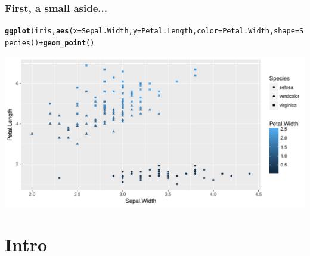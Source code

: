 \documentclass{beamer}\usepackage[]{graphicx}\usepackage[]{color}
\makeatletter
\def\maxwidth{ %
  \ifdim\Gin@nat@width>\linewidth
    \linewidth
  \else
    \Gin@nat@width
  \fi
}
\newcommand{\hlopt}[1]{\textcolor[rgb]{0,0,0}{#1}}%
\newcommand{\hlstd}[1]{\textcolor[rgb]{0.345,0.345,0.345}{#1}}%
\newcommand{\hlkwc}[1]{\textcolor[rgb]{0.333,0.667,0.333}{#1}}%
\newcommand{\hlkwd}[1]{\textcolor[rgb]{0.737,0.353,0.396}{\textbf{#1}}}%
\newenvironment{kframe}{%
 \def\at@end@of@kframe{}%
 \ifinner\ifhmode%
  \def\at@end@of@kframe{\end{minipage}}%
  \begin{minipage}{\columnwidth}%
 \fi\fi%
 \def\FrameCommand##1{\hskip\@totalleftmargin \hskip-\fboxsep
 \colorbox{shadecolor}{##1}\hskip-\fboxsep
     \hskip-\linewidth \hskip-\@totalleftmargin \hskip\columnwidth}%
 \MakeFramed {\advance\hsize-\width
   \@totalleftmargin\z@ \linewidth\hsize
   \@setminipage}}%
 {\par\unskip\endMakeFramed%
 \at@end@of@kframe}
\newenvironment{knitrout}{}{} %
\makeatother
\begin{document}
\begin{frame}[fragile]
\frametitle{First, a small aside...}

\begin{knitrout}\tiny
{}\color{fgcolor}\begin{kframe}
\begin{alltt}
\hlkwd{ggplot}\hlstd{(iris,} \hlkwd{aes}\hlstd{(}\hlkwc{x}\hlstd{=Sepal.Width,} \hlkwc{y}\hlstd{=Petal.Length,} \hlkwc{color}\hlstd{=Petal.Width,} \hlkwc{shape}\hlstd{=Species))} \hlopt{+} \hlkwd{geom_point}\hlstd{()}
\end{alltt}
\end{kframe}
\includegraphics[width=\maxwidth]{figure/unnamed-chunk-3-1} 

\end{knitrout}
\end{frame}

\section{Intro}
\end{document}
